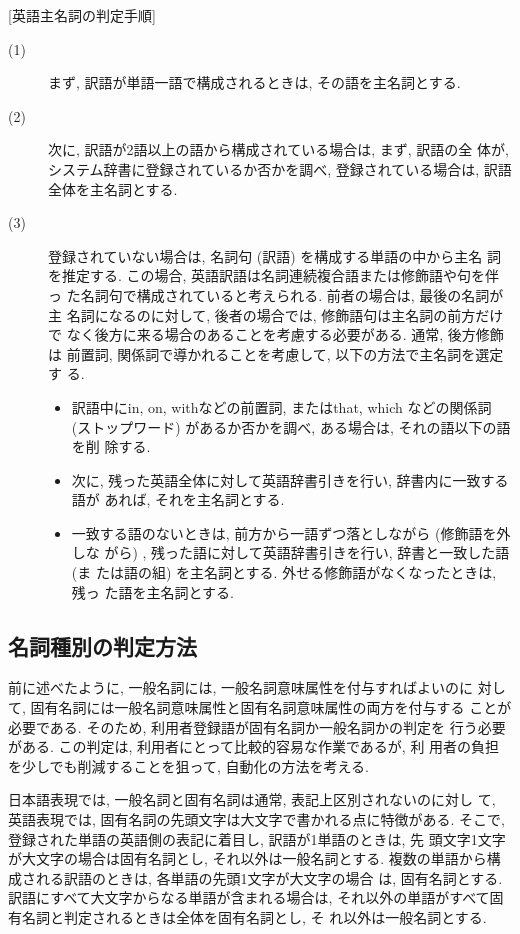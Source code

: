 [英語主名詞の判定手順]
\begin{description}
\item[(1)] まず, 訳語が単語一語で構成されるときは, その語を主名詞とする. 
\item[(2)] 次に, 訳語が2語以上の語から構成されている場合は, まず, 訳語の全
体が, システム辞書に登録されているか否かを調べ, 登録されている場合は, 
訳語全体を主名詞とする. 

\item[(3)] 登録されていない場合は, 名詞句 (訳語) を構成する単語の中から主名
詞を推定する. この場合, 英語訳語は名詞連続複合語または修飾語や句を伴っ
た名詞句で構成されていると考えられる. 前者の場合は, 最後の名詞が主
名詞になるのに対して, 後者の場合では, 修飾語句は主名詞の前方だけで
なく後方に来る場合のあることを考慮する必要がある. 通常, 後方修飾は
前置詞, 関係詞で導かれることを考慮して, 以下の方法で主名詞を選定す
る.  \begin{itemize}
\item 訳語中にin, on, withなどの前置詞, またはthat, which   などの関係詞
 (ストップワード) があるか否かを調べ, ある場合は, それの語以下の語を削
除する.  
\item 次に, 残った英語全体に対して英語辞書引きを行い, 辞書内に一致する語が
あれば, それを主名詞とする. 
\item 一致する語のないときは, 前方から一語ずつ落としながら (修飾語を外しな
がら) , 残った語に対して英語辞書引きを行い, 辞書と一致した語 (ま
たは語の組) を主名詞とする. 外せる修飾語がなくなったときは, 残っ
た語を主名詞とする. 
\end{itemize}
\end{description}


\subsection{名詞種別の判定方法}
\label{sec:3.2}

前に述べたように, 一般名詞には, 一般名詞意味属性を付与すればよいのに
対して, 固有名詞には一般名詞意味属性と固有名詞意味属性の両方を付与する
ことが必要である. そのため, 利用者登録語が固有名詞か一般名詞かの判定を
行う必要がある. この判定は, 利用者にとって比較的容易な作業であるが, 利
用者の負担を少しでも削減することを狙って, 自動化の方法を考える. 

日本語表現では, 一般名詞と固有名詞は通常, 表記上区別されないのに対し
て, 英語表現では, 固有名詞の先頭文字は大文字で書かれる点に特徴がある. 
そこで, 登録された単語の英語側の表記に着目し, 訳語が1単語のときは, 先
頭文字1文字が大文字の場合は固有名詞とし, それ以外は一般名詞とする. 
複数の単語から構成される訳語のときは, 各単語の先頭1文字が大文字の場合
は, 固有名詞とする. 訳語にすべて大文字からなる単語が含まれる場合は, 
それ以外の単語がすべて固有名詞と判定されるときは全体を固有名詞とし, そ
れ以外は一般名詞とする. 


